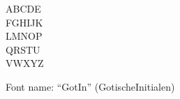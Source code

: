 \documentclass[a4paper]{article}
\begin{document}
\begin{center}
\fontsize{60pt}{72pt}
  ABCDE \\
  FGHIJK \\
  LMNOP \\
  QRSTU \\
  VWXYZ \\
\end{center}
\vfill
\begin{center}
Font name: ``GotIn'' (GotischeInitialen)
\end{center}
\end{document}

